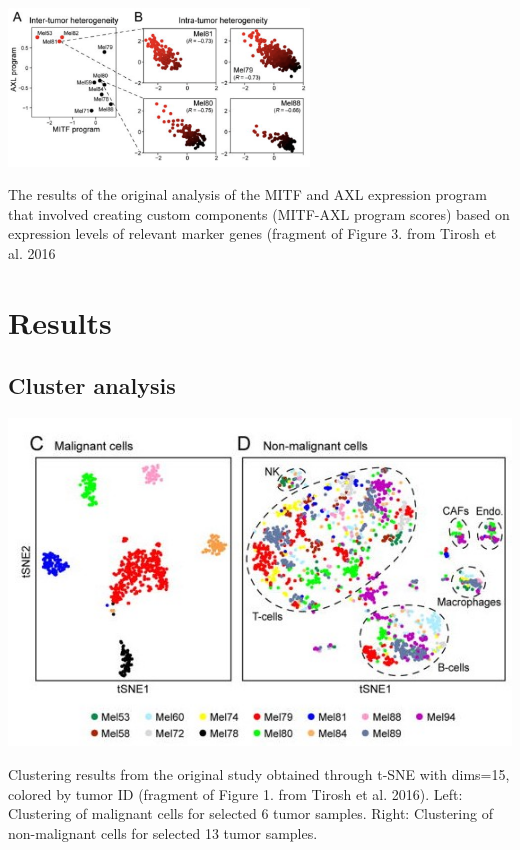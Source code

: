 \documentclass[11pt]{article}
\begin{document}
\begin{multicols}{2}
    \begin{center}
        \captionsetup{type=figure}
        \includegraphics[width=8cm]{plots/tirosh_mitf_axl.png}
        \caption{The results of the original analysis of the MITF and AXL expression program that involved creating custom components (MITF-AXL program scores) based on expression levels of relevant marker genes (fragment of Figure 3. from Tirosh et al. 2016}
        \label{fig:tirosh-mitf}
    \end{center}

\end{multicols}


\section{Results}

\subsection{Cluster analysis}

\begin{center}
    \captionsetup{type=figure}
    \includegraphics[width=15cm]{plots/tirosh_plots.jpg}
    \caption{Clustering results from the original study obtained through t-SNE with dims=15, colored by tumor ID (fragment of Figure 1. from Tirosh et al. 2016). Left: Clustering of malignant cells for selected 6 tumor samples. Right: Clustering of non-malignant cells for selected 13 tumor samples.}
    \label{fig:tirosh_plots}
\end{center}
\end{document}
